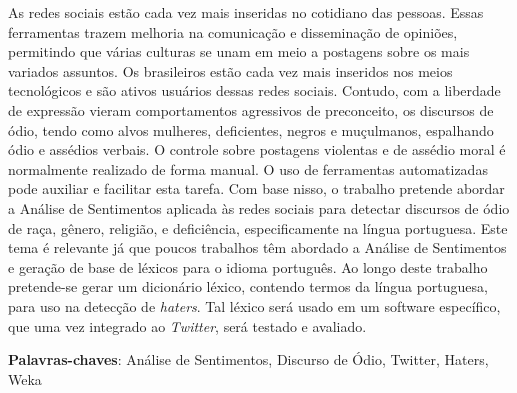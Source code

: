 \setlength{\absparsep}{18pt} %
\begin{resumo}

As redes sociais estão cada vez mais inseridas no cotidiano das pessoas. Essas ferramentas trazem melhoria na comunicação e disseminação de opiniões, permitindo que várias culturas se unam em meio a postagens sobre os mais variados assuntos. Os brasileiros estão cada vez mais inseridos nos meios tecnológicos e são ativos usuários dessas redes sociais. Contudo, com a liberdade de expressão vieram comportamentos agressivos de preconceito, os discursos de ódio, tendo como alvos mulheres, deficientes, negros e muçulmanos, espalhando ódio e assédios verbais. O controle sobre postagens violentas e de assédio moral é normalmente realizado de forma manual. O uso de ferramentas automatizadas pode auxiliar e facilitar esta tarefa. Com base nisso, o trabalho pretende abordar a Análise de Sentimentos aplicada às redes sociais para detectar discursos de ódio de raça, gênero, religião, e deficiência, especificamente na língua portuguesa. Este tema é relevante já que poucos trabalhos têm abordado a Análise de Sentimentos e geração de base de léxicos para o idioma português. Ao longo deste trabalho pretende-se gerar um dicionário léxico, contendo termos da língua portuguesa, para uso na detecção de \textit{haters}. Tal léxico será usado em um software específico, que uma vez integrado ao \textit{Twitter}, será testado e avaliado.

 \textbf{Palavras-chaves}: Análise de Sentimentos, Discurso de Ódio, Twitter, Haters, Weka
\end{resumo}

